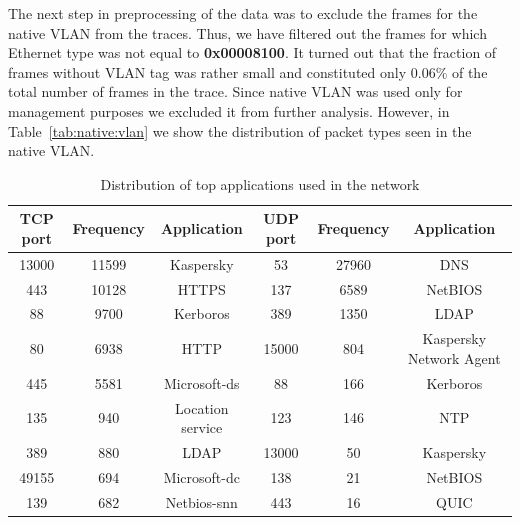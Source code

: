 The next step in preprocessing of the data was to exclude the frames 
for the native VLAN from the traces. Thus, we have filtered out 
the frames for which Ethernet type was not equal to {\bf 0x00008100}.
It turned out that the fraction of frames without VLAN tag was rather 
small and constituted only $0.06 \%$ of the total number of frames in 
the trace. Since native VLAN was used only for management purposes
we excluded it from further analysis. However, in Table~\ref{tab:native:vlan} we show 
the  distribution of packet types seen in the native VLAN.

\begin{table}[h!]
  \caption{Distribution of top applications used in the network}
  \label{tab:apps}
  \centering
  \begin{tabular}{cccccc}
    \hline
    {\bf TCP port} & {\bf Frequency } & {\bf Application} & {\bf UDP port} & {\bf Frequency} & {\bf Application}       \\
    \hline
         13000     & 11599            &  Kaspersky        &        53      &      27960      & DNS                     \\
         443       & 10128            &  HTTPS            &        137     &      6589       & NetBIOS                 \\
          88       & 9700             &  Kerboros         &       389      &      1350       & LDAP                    \\
          80       & 6938             &  HTTP             &     15000      &      804        & Kaspersky Network Agent \\
          445      & 5581             &  Microsoft-ds     &        88      &      166        & Kerboros                \\
          135      & 940              &  Location service &       123      &      146        & NTP                     \\
          389      & 880              &  LDAP             &      13000     &      50         & Kaspersky               \\
          49155    & 694              &  Microsoft-dc     &      138       &      21         & NetBIOS                 \\
          139      & 682              &  Netbios-snn      &      443       &      16         & QUIC                    \\
    \hline
  \end{tabular}
\end{table}

